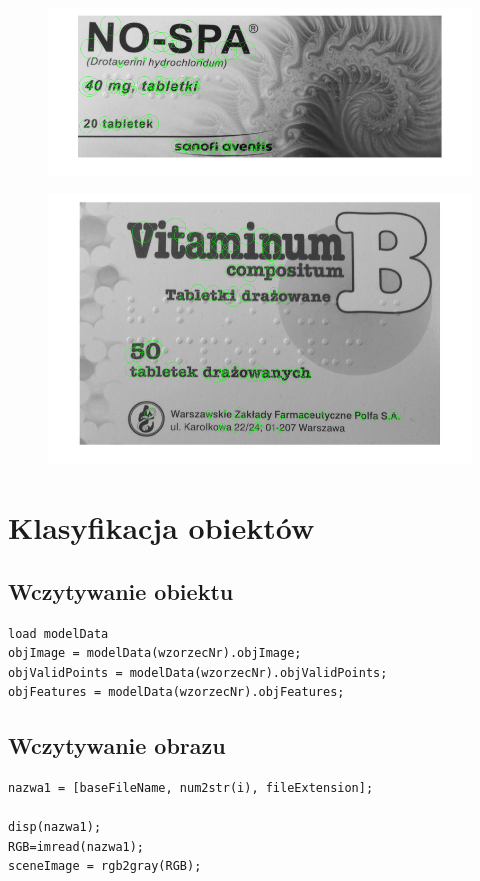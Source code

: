 \documentclass[a4paper, 12pt, titlepage]{article}
\begin{document}
        \begin{figure}[H]
            \centering
            \includegraphics[width=\linewidth]{first/nospa.png}
        \end{figure}
        \begin{figure}[H]
            \centering
            \includegraphics[width=\linewidth]{first/vitaminum.png}
        \end{figure}
    \section{Klasyfikacja obiektów}
        \subsection{Wczytywanie obiektu}
\begin{lstlisting}
load modelData
objImage = modelData(wzorzecNr).objImage;
objValidPoints = modelData(wzorzecNr).objValidPoints;
objFeatures = modelData(wzorzecNr).objFeatures;
\end{lstlisting}
        \subsection{Wczytywanie obrazu}
\begin{lstlisting}
nazwa1 = [baseFileName, num2str(i), fileExtension];

disp(nazwa1);
RGB=imread(nazwa1);
sceneImage = rgb2gray(RGB); 
\end{lstlisting}
\end{document}
